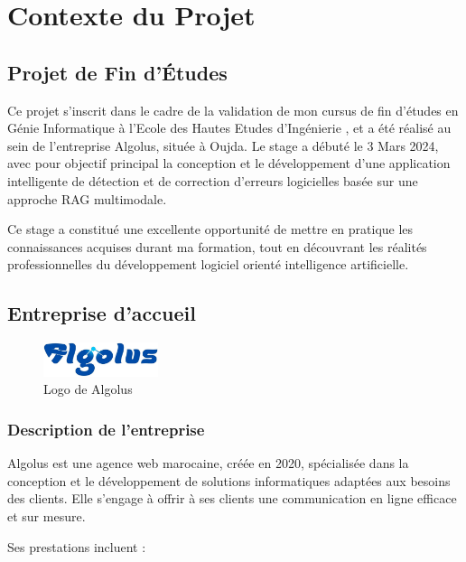 \documentclass[12pt,a4paper]{report}
\begin{document}
	
	\tableofcontents
	
	\chapter{Contexte du Projet}
	
	\section{Projet de Fin d’Études}
	
	Ce projet s’inscrit dans le cadre de la validation de mon cursus de fin d’études en Génie Informatique à l'Ecole des Hautes Etudes d'Ingénierie , et a été réalisé au sein de l’entreprise Algolus, située à Oujda. Le stage a débuté le 3 Mars 2024, avec pour objectif principal la conception et le développement d’une application intelligente de détection et de correction d’erreurs logicielles basée sur une approche RAG multimodale.
	
	Ce stage a constitué une excellente opportunité de mettre en pratique les connaissances acquises durant ma formation, tout en découvrant les réalités professionnelles du développement logiciel orienté intelligence artificielle.
	
	\section{Entreprise d’accueil}
	
	\begin{figure}[H]
		\centering
		\includegraphics[width=0.3\textwidth]{algolus-logo.png}
		\caption{Logo de Algolus}
		\label{fig:algolus-logo}
	\end{figure}
	
	\subsection{Description de l’entreprise}
	
	Algolus est une agence web marocaine, créée en 2020, spécialisée dans la conception et le développement de solutions informatiques adaptées aux besoins des clients. Elle s'engage à offrir à ses clients une communication en ligne efficace et sur mesure.

	Ses prestations incluent :
	
\end{document}
